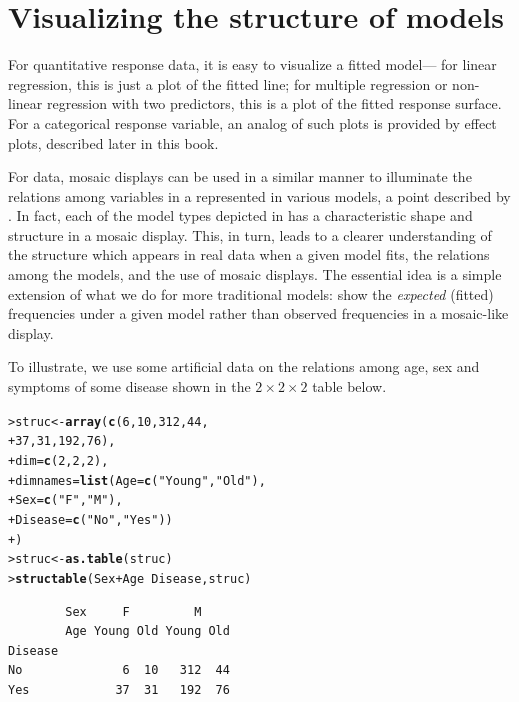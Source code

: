 \documentclass[10pt,krantz2]{krantz}\usepackage[]{graphicx}\usepackage[]{color}
\makeatletter
\newcommand{\hlnum}[1]{\textcolor[rgb]{0.686,0.059,0.569}{#1}}%
\newcommand{\hlstr}[1]{\textcolor[rgb]{0.192,0.494,0.8}{#1}}%
\newcommand{\hlopt}[1]{\textcolor[rgb]{0,0,0}{#1}}%
\newcommand{\hlstd}[1]{\textcolor[rgb]{0.345,0.345,0.345}{#1}}%
\newcommand{\hlkwb}[1]{\textcolor[rgb]{0.69,0.353,0.396}{#1}}%
\newcommand{\hlkwc}[1]{\textcolor[rgb]{0.333,0.667,0.333}{#1}}%
\newcommand{\hlkwd}[1]{\textcolor[rgb]{0.737,0.353,0.396}{\textbf{#1}}}%
\newenvironment{kframe}{%
 \def\at@end@of@kframe{}%
 \ifinner\ifhmode%
  \def\at@end@of@kframe{\end{minipage}}%
  \begin{minipage}{\columnwidth}%
 \fi\fi%
 \def\FrameCommand##1{\hskip\@totalleftmargin \hskip-\fboxsep
 \colorbox{shadecolor}{##1}\hskip-\fboxsep
     \hskip-\linewidth \hskip-\@totalleftmargin \hskip\columnwidth}%
 \MakeFramed {\advance\hsize-\width
   \@totalleftmargin\z@ \linewidth\hsize
   \@setminipage}}%
 {\par\unskip\endMakeFramed%
 \at@end@of@kframe}
\newenvironment{knitrout}{}{} %
\renewenvironment{knitrout}{\small\renewcommand{\baselinestretch}{.85}}{} %
\makeatother
\begin{document}
\section{Visualizing the structure of \loglin models}\label{sec:mosaic-struc}
For quantitative response data, it is easy to visualize a fitted model---
for linear regression, this is just a plot of the fitted line;
for multiple regression or non-linear regression with two predictors,
this is a plot of the fitted response surface.  For a categorical
response variable, an analog of such plots is provided by
effect plots, described later in this book.

For \ctab data,
mosaic displays can be used in a similar manner to illuminate the relations among
variables in a \ctab represented in various \loglin{} models,
a point described by \citet{TheusLauer:99}.
In fact,
each of the model types depicted in  has
a characteristic shape and structure in a mosaic display. This,
in turn, leads to a clearer understanding of the structure which appears
in real data when a given model fits, the relations among the models,
and the use of mosaic displays.  The essential idea is a simple
extension of what we do for more traditional models:
show the \emph{expected} (fitted) frequencies under a given model
rather than observed frequencies in a mosaic-like display.

To illustrate, we use some artificial data on the relations among
age, sex and symptoms of some disease shown in the $2 \times 2 \times 2$ table
 below.
\begin{knitrout}
\color{fgcolor}\begin{kframe}
\begin{alltt}
\hlstd{> }\hlstd{struc} \hlkwb{<-} \hlkwd{array}\hlstd{(}\hlkwd{c}\hlstd{(}\hlnum{6}\hlstd{,} \hlnum{10}\hlstd{,} \hlnum{312}\hlstd{,} \hlnum{44}\hlstd{,}
\hlstd{+ }                 \hlnum{37}\hlstd{,} \hlnum{31}\hlstd{,} \hlnum{192}\hlstd{,} \hlnum{76}\hlstd{),}
\hlstd{+ } \hlkwc{dim} \hlstd{=} \hlkwd{c}\hlstd{(}\hlnum{2}\hlstd{,} \hlnum{2}\hlstd{,} \hlnum{2}\hlstd{),}
\hlstd{+ } \hlkwc{dimnames} \hlstd{=} \hlkwd{list}\hlstd{(}\hlkwc{Age} \hlstd{=} \hlkwd{c}\hlstd{(}\hlstr{"Young"}\hlstd{,} \hlstr{"Old"}\hlstd{),}
\hlstd{+ }                 \hlkwc{Sex} \hlstd{=} \hlkwd{c}\hlstd{(}\hlstr{"F"}\hlstd{,} \hlstr{"M"}\hlstd{),}
\hlstd{+ }                 \hlkwc{Disease} \hlstd{=} \hlkwd{c}\hlstd{(}\hlstr{"No"}\hlstd{,} \hlstr{"Yes"}\hlstd{))}
\hlstd{+ } \hlstd{)}
\hlstd{> }\hlstd{struc} \hlkwb{<-} \hlkwd{as.table}\hlstd{(struc)}
\hlstd{> }\hlkwd{structable}\hlstd{(Sex} \hlopt{+} \hlstd{Age} \hlopt{~} \hlstd{Disease, struc)}
\end{alltt}
\begin{verbatim}
        Sex     F         M    
        Age Young Old Young Old
Disease                        
No              6  10   312  44
Yes            37  31   192  76
\end{verbatim}
\end{kframe}
\end{knitrout}
\end{document}
